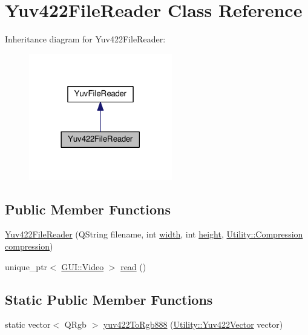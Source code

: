 \hypertarget{classUtility_1_1Yuv422FileReader}{}\section{Yuv422\+File\+Reader Class Reference}
\label{classUtility_1_1Yuv422FileReader}


Inheritance diagram for Yuv422\+File\+Reader\+:
\nopagebreak
\begin{figure}[H]
\begin{center}
\leavevmode
\includegraphics[width=177pt]{classUtility_1_1Yuv422FileReader__inherit__graph}
\end{center}
\end{figure}
\subsection*{Public Member Functions}
\begin{DoxyCompactItemize}
\item 
\hyperlink{classUtility_1_1Yuv422FileReader_a061cfaea6974d3d0ff811c44bf036edd}{Yuv422\+File\+Reader} (Q\+String filename, int \hyperlink{classUtility_1_1YuvFileReader_a2474a5474cbff19523a51eb1de01cda4}{width}, int \hyperlink{classUtility_1_1YuvFileReader_ad12fc34ce789bce6c8a05d8a17138534}{height}, \hyperlink{namespaceUtility_a56a83bf6847f4801f4205eb4be237ccf}{Utility\+::\+Compression} \hyperlink{classUtility_1_1Yuv422FileReader_aa484ffcb0c9f4d4dea91c6fae73f1fda}{compression})
\item 
unique\+\_\+ptr$<$ \hyperlink{classGUI_1_1Video}{G\+U\+I\+::\+Video} $>$ \hyperlink{classUtility_1_1Yuv422FileReader_ac6e45d1a396bdb81c8c8174bf5cc41c6}{read} ()
\end{DoxyCompactItemize}
\subsection*{Static Public Member Functions}
\begin{DoxyCompactItemize}
\item 
static vector$<$ Q\+Rgb $>$ \hyperlink{classUtility_1_1Yuv422FileReader_a6f6b820735249f6dfd2d3ee75cccc886}{yuv422\+To\+Rgb888} (\hyperlink{classUtility_1_1Yuv422Vector}{Utility\+::\+Yuv422\+Vector} vector)
\end{DoxyCompactItemize}
